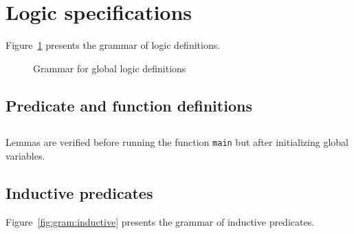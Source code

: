 
\section{Logic specifications}
\label{sec:logicspec}

\nodiff

Figure~\ref{fig:gram:logic} presents the grammar of logic definitions.

\begin{figure}[htbp]
  \caption{Grammar for global logic definitions}
\label{fig:gram:logic}
\end{figure}


\subsection{Predicate and function definitions}
\nodiff


\subsection{}
\nodiff

Lemmas are verified before running the function \lstinline|main| but after
initializing global variables.


\subsection{Inductive predicates}
\label{sec:inductivepredicates}
\experimental

\nodiff

Figure~\ref{fig:gram:inductive} presents the grammar of inductive predicates.

